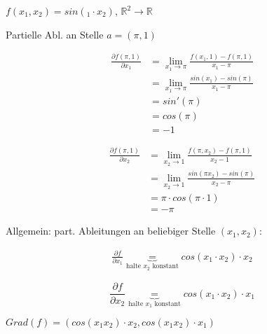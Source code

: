 \documentclass[a4paper, openany]{book}
\begin{document}
          $f(x_1, x_2) = sin(_1 \cdot x_2)$, $\mathbb{R}^2 \rightarrow \mathbb{R}$

          \par \medskip

          Partielle Abl. an Stelle $a = (\pi, 1)$

          \begin{align*}
            \frac{ \partial f(\pi, 1)}{\partial x_1} & = \lim_{x_1 \rightarrow \pi} \frac{f(x_1, 1) - f(\pi, 1)}{x_1- \pi} \\
            & = \lim_{x_1 \rightarrow \pi} \frac{sin(x_1) - sin(\pi)}{x_1 - \pi} \\
            & = sin'(\pi) \\
            & = cos(\pi) \\
            & = -1
          \end{align*}

          \begin{align*}
            \frac{\partial f(\pi, 1)}{\partial x_2} & = \lim_{x_2 \rightarrow 1} \frac{f(\pi, x_2) - f(\pi, 1)}{x_2-1} \\
            & = \lim_{x_2 \rightarrow 1} \frac{sin(\pi x_2) - sin(\pi)}{x_2-\pi} \\
            & = \pi \cdot cos(\pi \cdot 1) \\
            & = - \pi
          \end{align*}

          Allgemein: part. Ableitungen an beliebiger Stelle $(x_1, x_2)$:

          \begin{align*}
            \frac{\partial f}{\partial x_1} \underbrace{=}_{\text{halte $x_2$ konstant}} cos(x_1 \cdot x_2) \cdot x_2
          \end{align*}

          \[ \frac{\partial f}{\partial x_2} \underbrace{=}_{\text{halte $x_1$ konstant}} cos(x_1 \cdot x_2) \cdot x_1 \]

          \par \medskip
          
          $Grad(f) = (cos(x_1x_2) \cdot x_2, cos(x_1x_2) \cdot x_1)$


        

        
\end{document}
